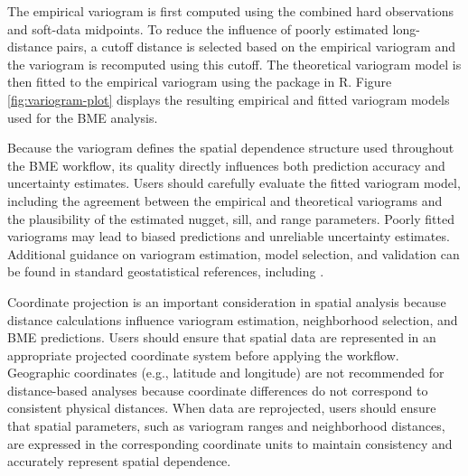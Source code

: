 The empirical variogram is first computed using the combined hard observations and soft-data midpoints. To reduce the influence of poorly estimated long-distance pairs, a cutoff distance is selected based on the empirical variogram and the variogram is recomputed using this cutoff. The theoretical variogram model is then fitted to the empirical variogram using the  package \citep{pebesma2004multivariable} in R. Figure \ref{fig:variogram-plot} displays the resulting empirical and fitted variogram models used for the BME analysis.

Because the variogram defines the spatial dependence structure used throughout the BME workflow, its quality directly influences both prediction accuracy and uncertainty estimates. Users should carefully evaluate the fitted variogram model, including the agreement between the empirical and theoretical variograms and the plausibility of the estimated nugget, sill, and range parameters. Poorly fitted variograms may lead to biased predictions and unreliable uncertainty estimates. Additional guidance on variogram estimation, model selection, and validation can be found in standard geostatistical references, including \citep{cressie1993statistics, chiles2012geostatistics, webster2007geostatistics}.

Coordinate projection is an important consideration in spatial analysis because distance calculations influence variogram estimation, neighborhood selection, and BME predictions. Users should ensure that spatial data are represented in an appropriate projected coordinate system before applying the  workflow. Geographic coordinates (e.g., latitude and longitude) are not recommended for distance-based analyses because coordinate differences do not correspond to consistent physical distances. When data are reprojected, users should ensure that spatial parameters, such as variogram ranges and neighborhood distances, are expressed in the corresponding coordinate units to maintain consistency and accurately represent spatial dependence.

